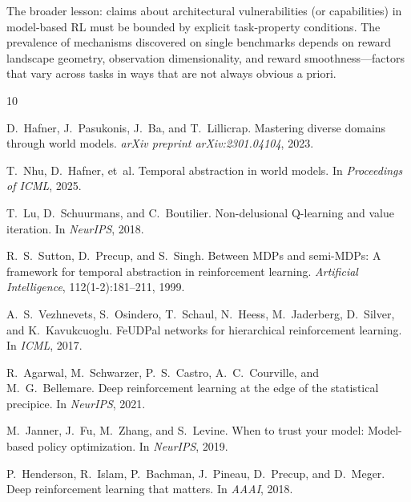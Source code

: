 \documentclass[letterpaper]{article}
\begin{document}
The broader lesson: claims about architectural vulnerabilities (or capabilities) in model-based RL must be bounded by explicit task-property conditions. The prevalence of mechanisms discovered on single benchmarks depends on reward landscape geometry, observation dimensionality, and reward smoothness---factors that vary across tasks in ways that are not always obvious a priori.


\begin{thebibliography}{10}

D.~Hafner, J.~Pasukonis, J.~Ba, and T.~Lillicrap.
\newblock Mastering diverse domains through world models.
\newblock \emph{arXiv preprint arXiv:2301.04104}, 2023.

T.~Nhu, D.~Hafner, et~al.
\newblock Temporal abstraction in world models.
\newblock In \emph{Proceedings of ICML}, 2025.

T.~Lu, D.~Schuurmans, and C.~Boutilier.
\newblock Non-delusional {Q}-learning and value iteration.
\newblock In \emph{NeurIPS}, 2018.

R.~S.~Sutton, D.~Precup, and S.~Singh.
\newblock Between {MDPs} and semi-{MDPs}: A framework for temporal abstraction in reinforcement learning.
\newblock \emph{Artificial Intelligence}, 112(1-2):181--211, 1999.

A.~S.~Vezhnevets, S.~Osindero, T.~Schaul, N.~Heess, M.~Jaderberg, D.~Silver, and K.~Kavukcuoglu.
\newblock Fe{UDP}al networks for hierarchical reinforcement learning.
\newblock In \emph{ICML}, 2017.

R.~Agarwal, M.~Schwarzer, P.~S.~Castro, A.~C.~Courville, and M.~G.~Bellemare.
\newblock Deep reinforcement learning at the edge of the statistical precipice.
\newblock In \emph{NeurIPS}, 2021.

M.~Janner, J.~Fu, M.~Zhang, and S.~Levine.
\newblock When to trust your model: Model-based policy optimization.
\newblock In \emph{NeurIPS}, 2019.

P.~Henderson, R.~Islam, P.~Bachman, J.~Pineau, D.~Precup, and D.~Meger.
\newblock Deep reinforcement learning that matters.
\newblock In \emph{AAAI}, 2018.

\end{thebibliography}
\end{document}
